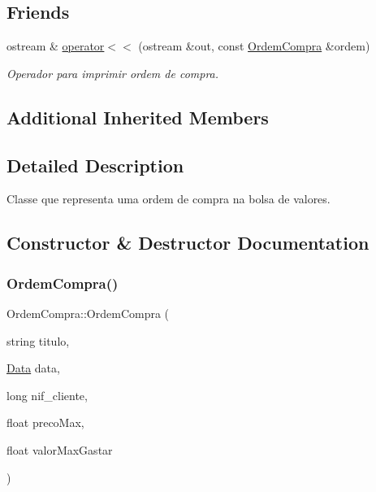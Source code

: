 \subsection*{Friends}
\begin{DoxyCompactItemize}
\item 
ostream \& \hyperlink{class_ordem_compra_af2f3323b475ba777c890c63648d24e5d}{operator$<$$<$} (ostream \&out, const \hyperlink{class_ordem_compra}{Ordem\+Compra} \&ordem)
\begin{DoxyCompactList}\small\item\em Operador para imprimir ordem de compra. \end{DoxyCompactList}\end{DoxyCompactItemize}
\subsection*{Additional Inherited Members}


\subsection{Detailed Description}
Classe que representa uma ordem de compra na bolsa de valores. 

\subsection{Constructor \& Destructor Documentation}
\hypertarget{class_ordem_compra_a98bff4c9185593d197e72a7f14e5856f}{}\label{class_ordem_compra_a98bff4c9185593d197e72a7f14e5856f} 
\subsubsection{\texorpdfstring{Ordem\+Compra()}{OrdemCompra()}}
{\footnotesize\ttfamily Ordem\+Compra\+::\+Ordem\+Compra (\begin{DoxyParamCaption}\item[{string}]{titulo,  }\item[{\hyperlink{class_data}{Data}}]{data,  }\item[{long}]{nif\+\_\+cliente,  }\item[{float}]{preco\+Max,  }\item[{float}]{valor\+Max\+Gastar }\end{DoxyParamCaption})}



